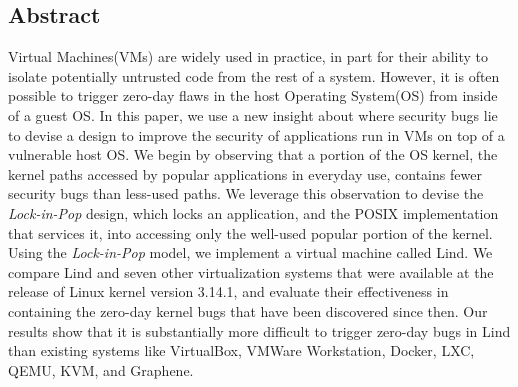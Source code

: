\subsection*{Abstract}

Virtual Machines(VMs) are widely used in practice, in part for their ability to
isolate potentially untrusted code from the rest of a system.
However, it is often possible to trigger zero-day flaws
in the host Operating System(OS) from inside of a guest OS. 
%
In this paper, we use a new insight about where security bugs lie to devise a design to improve the security of applications
run in VMs on top of a vulnerable host OS. 
We begin by observing that a portion of the OS kernel, the kernel paths accessed
by popular applications in everyday use, contains fewer security bugs than less-used paths. We
leverage this observation to devise the \emph{Lock-in-Pop} design, which
locks an application, and the POSIX implementation that services it, into
accessing only the well-used popular portion of the kernel.  Using the \emph{Lock-in-Pop} model, we
implement a virtual machine called Lind.
%
We compare Lind and seven other virtualization systems that were
available at the release of Linux kernel version 3.14.1, and evaluate
their effectiveness in containing the zero-day kernel bugs that have been discovered
since then.
%
Our results show that it is substantially more difficult to trigger zero-day bugs in
Lind than existing systems like VirtualBox, VMWare Workstation, 
Docker, LXC, QEMU, KVM, and Graphene.